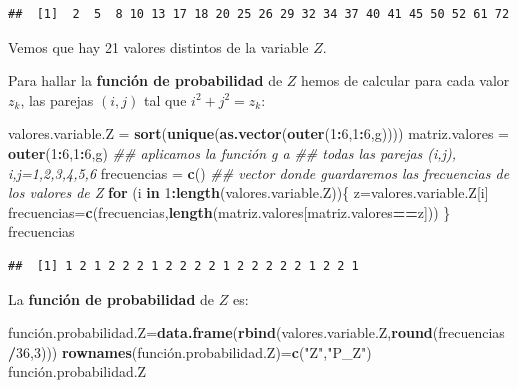 \documentclass[]{book}
\newenvironment{Shaded}{\begin{snugshade}}{\end{snugshade}}
\newcommand{\CommentTok}[1]{\textcolor[rgb]{0.56,0.35,0.01}{\textit{#1}}}
\newcommand{\ControlFlowTok}[1]{\textcolor[rgb]{0.13,0.29,0.53}{\textbf{#1}}}
\newcommand{\DecValTok}[1]{\textcolor[rgb]{0.00,0.00,0.81}{#1}}
\newcommand{\KeywordTok}[1]{\textcolor[rgb]{0.13,0.29,0.53}{\textbf{#1}}}
\newcommand{\NormalTok}[1]{#1}
\newcommand{\OperatorTok}[1]{\textcolor[rgb]{0.81,0.36,0.00}{\textbf{#1}}}
\newcommand{\StringTok}[1]{\textcolor[rgb]{0.31,0.60,0.02}{#1}}
\begin{document}
\begin{verbatim}
##  [1]  2  5  8 10 13 17 18 20 25 26 29 32 34 37 40 41 45 50 52 61 72
\end{verbatim}

Vemos que hay 21 valores distintos de la variable \(Z\).

Para hallar la \textbf{función de probabilidad} de \(Z\) hemos de calcular para cada valor \(z_k\), las parejas \((i,j)\) tal que \(i^2+j^2=z_k\):

\begin{Shaded}
\begin{Highlighting}[]
\NormalTok{valores.variable.Z =}\StringTok{ }\KeywordTok{sort}\NormalTok{(}\KeywordTok{unique}\NormalTok{(}\KeywordTok{as.vector}\NormalTok{(}\KeywordTok{outer}\NormalTok{(}\DecValTok{1}\OperatorTok{:}\DecValTok{6}\NormalTok{,}\DecValTok{1}\OperatorTok{:}\DecValTok{6}\NormalTok{,g))))  }
\NormalTok{matriz.valores =}\StringTok{ }\KeywordTok{outer}\NormalTok{(}\DecValTok{1}\OperatorTok{:}\DecValTok{6}\NormalTok{,}\DecValTok{1}\OperatorTok{:}\DecValTok{6}\NormalTok{,g) }\CommentTok{## aplicamos la función g a }
\CommentTok{##  todas las parejas (i,j), i,j=1,2,3,4,5,6}
\NormalTok{frecuencias =}\StringTok{ }\KeywordTok{c}\NormalTok{()  }\CommentTok{## vector donde guardaremos las frecuencias de los valores de Z}
\ControlFlowTok{for}\NormalTok{ (i }\ControlFlowTok{in} \DecValTok{1}\OperatorTok{:}\KeywordTok{length}\NormalTok{(valores.variable.Z))\{}
\NormalTok{  z=valores.variable.Z[i]}
\NormalTok{  frecuencias=}\KeywordTok{c}\NormalTok{(frecuencias,}\KeywordTok{length}\NormalTok{(matriz.valores[matriz.valores}\OperatorTok{==}\NormalTok{z]))}
\NormalTok{\}}
\NormalTok{frecuencias}
\end{Highlighting}
\end{Shaded}

\begin{verbatim}
##  [1] 1 2 1 2 2 2 1 2 2 2 2 1 2 2 2 2 2 1 2 2 1
\end{verbatim}

La \textbf{función de probabilidad} de \(Z\) es:

\begin{Shaded}
\begin{Highlighting}[]
\NormalTok{función.probabilidad.Z=}\KeywordTok{data.frame}\NormalTok{(}\KeywordTok{rbind}\NormalTok{(valores.variable.Z,}\KeywordTok{round}\NormalTok{(frecuencias}\OperatorTok{/}\DecValTok{36}\NormalTok{,}\DecValTok{3}\NormalTok{)))}
\KeywordTok{rownames}\NormalTok{(función.probabilidad.Z)=}\KeywordTok{c}\NormalTok{(}\StringTok{"Z"}\NormalTok{,}\StringTok{"P_Z"}\NormalTok{)}
\NormalTok{función.probabilidad.Z}
\end{Highlighting}
\end{Shaded}
\end{document}

